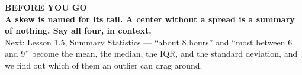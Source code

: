 \documentclass[aspectratio=169, 11pt]{beamer}
\begin{document}
{
\begin{frame}[plain]
  \vspace{1.5cm}\hspace{0.8cm}%
  \begin{minipage}{0.86\textwidth}
    {\color{goldacc}\bfseries\small BEFORE YOU GO}\\[0.7cm]
    {\color{white}\bfseries\Large A skew is named for its tail. A center without a spread is a
    summary of nothing. Say all four, in context.}\\[0.9cm]
    {\color{skymid}\small Next: Lesson 1.5, Summary Statistics --- ``about 8 hours'' and ``most
    between 6 and 9'' become the mean, the median, the IQR, and the standard deviation, and we
    find out which of them an outlier can drag around.}
  \end{minipage}
\end{frame}
}
\end{document}
